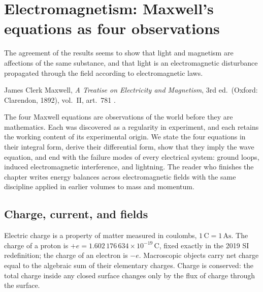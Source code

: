 \chapter{Electromagnetism: Maxwell's equations as four observations}
\label{vol04:ch08}

\epigraph{The agreement of the results seems to show that light and
magnetism are affections of the same substance, and that light is an
electromagnetic disturbance propagated through the field according to
electromagnetic laws.}{James Clerk Maxwell, \emph{A Treatise on
Electricity and Magnetism}, 3rd ed.\ (Oxford: Clarendon, 1892),
vol.~II, art.~781 \cite[vol.~II, p.~431]{hist:maxwell1873}.}


\noindent
The four Maxwell equations are observations of the world before they
are mathematics. Each was discovered as a regularity in experiment, and
each retains the working content of its experimental origin. We state
the four equations in their integral form, derive their differential
form, show that they imply the wave equation, and end with the
failure modes of every electrical system: ground loops, induced
electromagnetic interference, and lightning. The reader who finishes
the chapter writes energy balances across electromagnetic fields with
the same discipline applied in earlier volumes to mass and momentum.

\section{Charge, current, and fields}

Electric charge is a property of matter measured in coulombs, $1\,\si{
\coulomb} = 1\,\si{\ampere\second}$. The charge of a proton is
$+e = 1.602\,176\,634\times 10^{-19}\,\si{\coulomb}$, fixed exactly in
the 2019 SI redefinition; the charge of an electron is $-e$. Macroscopic
objects carry net charge equal to the algebraic sum of their elementary
charges. Charge is conserved: the total charge inside any closed
surface changes only by the flux of charge through the surface.

